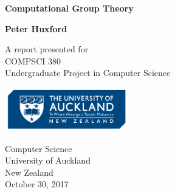 \begin{titlepage}
  \begin{center}
    \vspace*{1cm}

    \Huge
    \textbf{Computational Group Theory}

    \vspace{2cm}

    \textbf{Peter Huxford}

    \vfill

    A report presented for\\
    COMPSCI 380\\
    Undergraduate Project in Computer Science

    \vspace{0.8cm}

    \includegraphics[width=0.4\textwidth]{UoA.png}

    \Large
    Computer Science\\
    University of Auckland\\
    New Zealand\\
    October 30, 2017

  \end{center}
\end{titlepage}